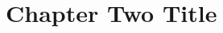 \documentclass[../main]{subfiles}
\begin{document}
\chapter{Chapter Two Title}
\lipsum[2-10]
\end{document}
